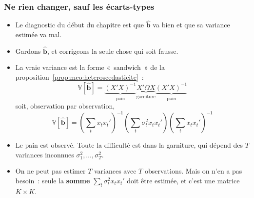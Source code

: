 \documentclass[10pt]{beamer}
\begin{document}
\begin{frame}
  \frametitle{Ne rien changer, sauf les écarts-types}

  \begin{itemize}

  \item Le diagnostic du début du chapitre est que $\hat{\mathbf b}$ va bien et
    que sa variance estimée va mal.\newline

  \item[$\Rightarrow$] Gardons $\hat{\mathbf b}$, et corrigeons la seule chose
    qui soit fausse.\newline

  \item La vraie variance est la forme «~sandwich~» de la
    proposition~\ref{prop:mco:heteroscedasticite}~:
    \[
      \mathbb V\left[\hat{\mathbf b}\right] = \underbrace{(X'X)^{-1}}_{\text{pain}}
      \underbrace{X'\Omega X}_{\text{garniture}} \underbrace{(X'X)^{-1}}_{\text{pain}}
    \]
    soit, observation par observation,
    \[
      \mathbb V\left[\hat{\mathbf b}\right] =
      \left(\sum_t x_tx_t'\right)^{-1}
      \left(\sum_t \sigma_t^2x_tx_t'\right)
      \left(\sum_t x_tx_t'\right)^{-1}
    \]

  \item Le pain est observé. Toute la difficulté est dans la garniture, qui
    dépend des $T$ variances inconnues $\sigma_1^2,\ldots,\sigma_T^2$.\newline

  \item[\dbend] On ne peut pas estimer $T$ variances avec $T$ observations. Mais
    on n'en a pas besoin~: seule la \textbf{somme} $\sum_t\sigma_t^2x_tx_t'$
    doit être estimée, et c'est une matrice $K\times K$.

  \end{itemize}

\end{frame}
\end{document}

